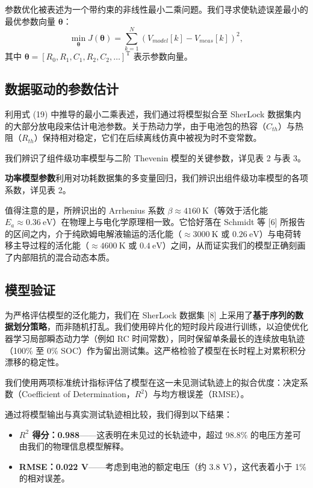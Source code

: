 \documentclass[11pt,a4paper]{ctexart}
\begin{document}
参数优化被表述为一个带约束的非线性最小二乘问题。我们寻求使轨迹误差最小的最优参数向量 $\bm{\theta}$：
\begin{equation}
\min_{\bm{\theta}} J(\bm{\theta})=\sum_{k=1}^{N}\left(V_{model}[k]-V_{meas}[k]\right)^2,
\end{equation}
其中 $\bm{\theta}=[R_0,R_1,C_1,R_2,C_2,\dots]^{\mathrm{T}}$ 表示参数向量。

\subsection{数据驱动的参数估计}

利用式 (19) 中推导的最小二乘表述，我们通过将模型拟合至 SherLock 数据集内的大部分放电段来估计电池参数。关于热动力学，由于电池包的热容（$C_{th}$）与热阻（$R_{th}$）保持相对稳定，它们在后续离线仿真中被视为时不变常数。

我们辨识了组件级功率模型与二阶 Thevenin 模型的关键参数，详见表 2 与表 3。

\noindent\textbf{功率模型参数}\quad 利用对功耗数据集的多变量回归，我们辨识出组件级功率模型的各项系数，详见表 2。

值得注意的是，所辨识出的 Arrhenius 系数 $\beta\approx 4160\ \mathrm{K}$（等效于活化能 $E_a\approx 0.36\ \mathrm{eV}$）在物理上与电化学原理相一致。它恰好落在 Schmidt 等 [6] 所报告的区间之内，介于纯欧姆电解液输运的活化能（$\approx 3000\ \mathrm{K}$ 或 $0.26\ \mathrm{eV}$）与电荷转移主导过程的活化能（$\approx 4600\ \mathrm{K}$ 或 $0.4\ \mathrm{eV}$）之间，从而证实我们的模型正确刻画了内部阻抗的混合动态本质。

\subsection{模型验证}

为严格评估模型的泛化能力，我们在 SherLock 数据集 [8] 上采用了\textbf{基于序列的数据划分策略}，而非随机打乱。我们使用碎片化的短时段片段进行训练，以迫使优化器学习局部瞬态动力学（例如 RC 时间常数），同时保留单条最长的连续放电轨迹（100\% 至 0\% SOC）作为留出测试集。这严格检验了模型在长时程上对累积积分漂移的稳定性。

我们使用两项标准统计指标评估了模型在这一未见测试轨迹上的拟合优度：决定系数（Coefficient of Determination，$R^2$）与均方根误差（RMSE）。

通过将模型输出与真实测试轨迹相比较，我们得到以下结果：

\begin{itemize}[leftmargin=1.6em,itemsep=0.3em]
\item \textbf{$R^2$ 得分：0.988}——这表明在未见过的长轨迹中，超过 98.8\% 的电压方差可由我们的物理信息模型解释。
\item \textbf{RMSE：0.022 V}——考虑到电池的额定电压（约 3.8 V），这代表着小于 1\% 的相对误差。
\end{itemize}
\end{document}
